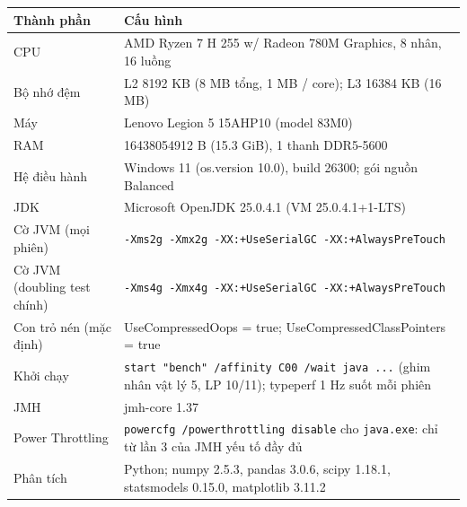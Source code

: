 \begin{tabularx}{\linewidth}{lX}
\toprule
Thành phần & Cấu hình \\
\midrule
CPU & AMD Ryzen 7 H 255 w/ Radeon 780M Graphics, 8 nhân, 16 luồng \\
Bộ nhớ đệm & L2 8192 KB (8 MB tổng, 1 MB / core); L3 16384 KB (16 MB) \\
Máy & Lenovo Legion 5 15AHP10 (model 83M0) \\
RAM & \num{16438054912} B (15.3 GiB), 1 thanh DDR5-5600 \\
Hệ điều hành & Windows 11 (os.version 10.0), build 26300; gói nguồn Balanced \\
JDK & Microsoft OpenJDK 25.0.4.1 (VM 25.0.4.1+1-LTS) \\
Cờ JVM (mọi phiên) & \texttt{-Xms2g -Xmx2g -XX:+UseSerialGC -XX:+AlwaysPreTouch} \\
Cờ JVM (doubling test chính) & \texttt{-Xms4g -Xmx4g -XX:+UseSerialGC -XX:+AlwaysPreTouch} \\
Con trỏ nén (mặc định) & UseCompressedOops = true; UseCompressedClassPointers = true \\
Khởi chạy & \texttt{start "bench" /affinity C00 /wait java ...} (ghim nhân vật lý 5, LP 10/11); typeperf 1 Hz suốt mỗi phiên \\
JMH & jmh-core 1.37 \\
Power Throttling & \texttt{powercfg /powerthrottling disable} cho \texttt{java.exe}: chỉ từ lần 3 của JMH yếu tố đầy đủ \\
Phân tích & Python; numpy 2.5.3, pandas 3.0.6, scipy 1.18.1, statsmodels 0.15.0, matplotlib 3.11.2 \\
\bottomrule
\end{tabularx}
